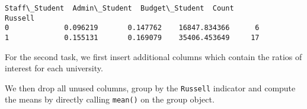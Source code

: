 \documentclass{scrartcl}
\makeatletter
\newcommand{\boxspacing}{\kern\kvtcb@left@rule\kern\kvtcb@boxsep}
\newcommand{\prompt}[4]{
        {\ttfamily\llap{{\color{#2}[#3]:\hspace{3pt}#4}}\vspace{-\baselineskip}}
    }
\makeatother
\begin{document}
            \begin{tcolorbox}[breakable, size=fbox, boxrule=.5pt, pad at break*=1mm, opacityfill=0]
\prompt{Out}{outcolor}{43}{\boxspacing}
\begin{Verbatim}[commandchars=\\\{\}]
         Staff\_Student  Admin\_Student  Budget\_Student  Count
Russell
0             0.096219       0.147762    16847.834366      6
1             0.155131       0.169079    35406.453649     17
\end{Verbatim}
\end{tcolorbox}
        
    For the second task, we first insert additional columns which contain
the ratios of interest for each university.

We then drop all unused columns, group by the \texttt{Russell} indicator
and compute the means by directly calling \texttt{mean()} on the group
object.
\end{document}
